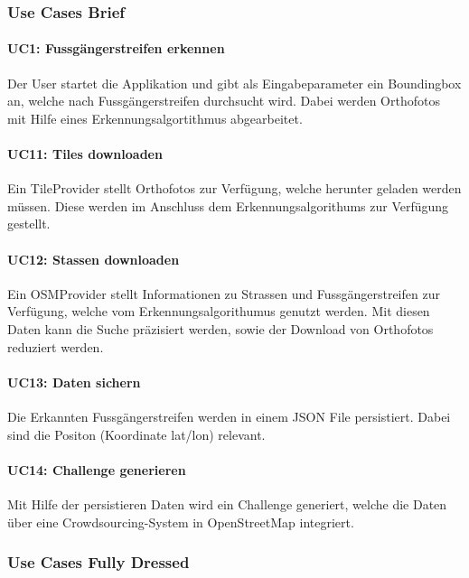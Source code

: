 \subsubsection{Use Cases Brief}
\paragraph{UC1: Fussgängerstreifen erkennen}
Der User startet die Applikation und gibt als Eingabeparameter ein Boundingbox an, welche nach Fussgängerstreifen durchsucht wird. Dabei werden Orthofotos mit Hilfe eines Erkennungsalgortithmus abgearbeitet.

\paragraph{UC11: Tiles downloaden} 
Ein TileProvider stellt Orthofotos zur Verfügung, welche herunter geladen werden müssen. Diese werden im Anschluss dem Erkennungsalgorithums zur Verfügung gestellt.

\paragraph{UC12: Stassen downloaden}
Ein OSMProvider stellt Informationen zu Strassen und Fussgängerstreifen zur Verfügung, welche vom Erkennungsalgorithumus genutzt werden. Mit diesen Daten kann die Suche präzisiert werden, sowie der Download von Orthofotos reduziert werden.

\paragraph{UC13: Daten sichern}
Die Erkannten Fussgängerstreifen werden in einem JSON File persistiert. Dabei sind die Positon (Koordinate lat/lon) relevant.

\paragraph{UC14: Challenge generieren}
Mit Hilfe der persistieren Daten wird ein Challenge generiert, welche die Daten über eine Crowdsourcing-System in OpenStreetMap integriert.

\subsubsection{Use Cases Fully Dressed}
